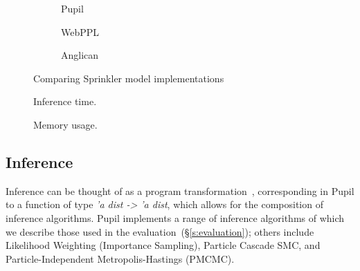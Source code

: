 \documentclass[sigconf]{acmart}
\newcommand{\s}[1]{(\S\ref{#1})}
\newcommand{\pupil}{Pupil\xspace}
\begin{document}
\begin{figure}
  \begin{subfigure}[t]{\linewidth}
    \caption{\label{lst:linreg:pupil}\pupil}
  \end{subfigure}
  \quad
  \begin{subfigure}[t]{\linewidth}
    \caption{\label{lst:linreg:webppl}WebPPL}
  \end{subfigure}
  \quad
  \begin{subfigure}[t]{\linewidth}
    \caption{\label{lst:linreg:anglican}Anglican}
  \end{subfigure}
  \caption{\label{lst:linreg}Comparing Sprinkler model implementations}
\end{figure}
\begin{figure*}
  \centering
  \begin{subfigure}[t]{\textwidth}
    \centering
    
    \caption{\label{fig:time-perf}
      Inference time.}
  \end{subfigure}
  \begin{subfigure}[t]{\textwidth}
    \centering
    
    \caption{\label{fig:mem-perf}
      Memory usage.}
  \end{subfigure}
  \caption{\pupil performance on different models, taking 10,000 samples from the posterior and averaging over 20 runs. Results shown for Metropolis-Hastings (\emph{mh}), Bootstrap Particle Filter (also known as Sequential Monte Carlo, \emph{smc}), and Rejection Sampling (\emph{rej}). Error bars show the 95\% confidence interval. }
\end{figure*}


\subsection{Inference}
Inference can be thought of as a program transformation~\cite{scibior2015practical, Zinkov2016ComposingIA}, corresponding in \pupil to a function of type \emph{'a dist -> 'a dist}, which allows for the composition of inference algorithms. \pupil implements a range of inference algorithms of which we describe those used in the evaluation~\s{s:evaluation}; others include Likelihood Weighting (Importance Sampling), Particle Cascade SMC, and Particle-Independent Metropolis-Hastings (PMCMC).
\end{document}
